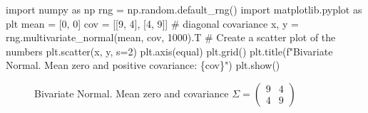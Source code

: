 \documentclass[
  letterpaper,
  DIV=11,
  numbers=noendperiod]{scrreprt}
\newenvironment{Shaded}{\begin{snugshade}}{\end{snugshade}}
\newcommand{\CommentTok}[1]{\textcolor[rgb]{0.37,0.37,0.37}{#1}}
\newcommand{\DecValTok}[1]{\textcolor[rgb]{0.68,0.00,0.00}{#1}}
\newcommand{\ImportTok}[1]{\textcolor[rgb]{0.00,0.46,0.62}{#1}}
\newcommand{\NormalTok}[1]{\textcolor[rgb]{0.00,0.23,0.31}{#1}}
\newcommand{\OperatorTok}[1]{\textcolor[rgb]{0.37,0.37,0.37}{#1}}
\newcommand{\SpecialCharTok}[1]{\textcolor[rgb]{0.37,0.37,0.37}{#1}}
\newcommand{\SpecialStringTok}[1]{\textcolor[rgb]{0.13,0.47,0.30}{#1}}
\newcommand{\StringTok}[1]{\textcolor[rgb]{0.13,0.47,0.30}{#1}}
\begin{document}
\begin{Shaded}
\begin{Highlighting}[]
\ImportTok{import}\NormalTok{ numpy }\ImportTok{as}\NormalTok{ np}
\NormalTok{rng }\OperatorTok{=}\NormalTok{ np.random.default\_rng()}
\ImportTok{import}\NormalTok{ matplotlib.pyplot }\ImportTok{as}\NormalTok{ plt}
\NormalTok{mean }\OperatorTok{=}\NormalTok{ [}\DecValTok{0}\NormalTok{, }\DecValTok{0}\NormalTok{]}
\NormalTok{cov }\OperatorTok{=}\NormalTok{ [[}\DecValTok{9}\NormalTok{, }\DecValTok{4}\NormalTok{], [}\DecValTok{4}\NormalTok{, }\DecValTok{9}\NormalTok{]]  }\CommentTok{\# diagonal covariance}
\NormalTok{x, y }\OperatorTok{=}\NormalTok{ rng.multivariate\_normal(mean, cov, }\DecValTok{1000}\NormalTok{).T}
\CommentTok{\# Create a scatter plot of the numbers}
\NormalTok{plt.scatter(x, y, s}\OperatorTok{=}\DecValTok{2}\NormalTok{)}
\NormalTok{plt.axis(}\StringTok{\textquotesingle{}equal\textquotesingle{}}\NormalTok{)}
\NormalTok{plt.grid()}
\NormalTok{plt.title(}\SpecialStringTok{f"Bivariate Normal. Mean zero and positive covariance: }\SpecialCharTok{\{}\NormalTok{cov}\SpecialCharTok{\}}\SpecialStringTok{"}\NormalTok{)}
\NormalTok{plt.show()}
\end{Highlighting}
\end{Shaded}

\begin{figure}[H]


\caption{\label{fig-bi9040}Bivariate Normal. Mean zero and covariance
\(\Sigma=\begin{pmatrix} 9 & 4 \\ 4 & 9\end{pmatrix}\)}

\end{figure}%
\end{document}
